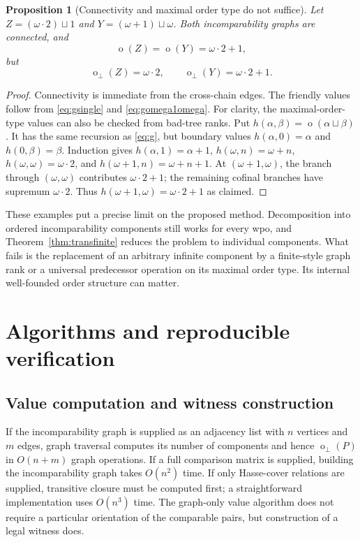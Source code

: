 \documentclass[11pt,a4paper]{article}
\newtheorem{proposition}[theorem]{Proposition}
\theoremstyle{definition}
\theoremstyle{remark}
\newcommand{\fot}{\operatorname{o}_{\perp}}
\newcommand{\mot}{\operatorname{o}}
\begin{document}
\begin{proposition}[Connectivity and maximal order type do not suffice]\label{prop:infinitemot}
Let $Z=(\omega\cdot2)\sqcup1$ and $Y=(\omega+1)\sqcup\omega$.
Both incomparability graphs are connected, and
\[
 \mot(Z)=\mot(Y)=\omega\cdot2+1,
\]
but
\[
 \fot(Z)=\omega\cdot2,\qquad \fot(Y)=\omega\cdot2+1.
\]
\end{proposition}

\begin{proof}
Connectivity is immediate from the cross-chain edges. The friendly values
follow from \eqref{eq:gsingle} and \eqref{eq:gomega1omega}.
For clarity, the maximal-order-type values can also be checked from bad-tree
ranks. Put $h(\alpha,\beta)=\mot(\alpha\sqcup\beta)$. It has the same
recursion as \eqref{eq:g}, but boundary values
$h(\alpha,0)=\alpha$ and $h(0,\beta)=\beta$. Induction gives
$h(\alpha,1)=\alpha+1$,
$h(\omega,n)=\omega+n$,
$h(\omega,\omega)=\omega\cdot2$, and
$h(\omega+1,n)=\omega+n+1$.
At $(\omega+1,\omega)$, the branch through $(\omega,\omega)$ contributes
$\omega\cdot2+1$; the remaining cofinal branches have supremum
$\omega\cdot2$. Thus $h(\omega+1,\omega)=\omega\cdot2+1$ as claimed.
\end{proof}

These examples put a precise limit on the proposed method. Decomposition
into ordered incomparability components still works for every wpo, and
Theorem~\ref{thm:transfinite} reduces the problem to individual components.
What fails is the replacement of an arbitrary infinite component by a
finite-style graph rank or a universal predecessor operation on its maximal
order type. Its internal well-founded order structure can matter.

\section{Algorithms and reproducible verification}

\subsection{Value computation and witness construction}

If the incomparability graph is supplied as an adjacency list with $n$
vertices and $m$ edges, graph traversal computes its number of components
and hence $\fot(P)$ in $O(n+m)$ graph operations. If a full comparison
matrix is supplied, building the incomparability graph takes $O(n^2)$
time. If only Hasse-cover relations are supplied, transitive closure must
be computed first; a straightforward implementation uses $O(n^3)$ time.
The graph-only value algorithm does not require a particular orientation
of the comparable pairs, but construction of a legal witness does.
\end{document}
